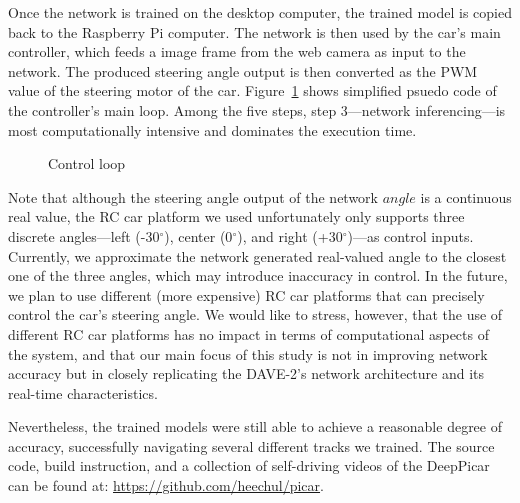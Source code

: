 Once the network is trained on the desktop computer, the trained model
is copied back to the Raspberry Pi computer. The network is then used
by the car's main controller, which feeds a image frame from the web
camera as input to the network. The produced steering angle output is
then converted as the PWM value of the steering motor of the
car. Figure~\ref{fig:controlloop} shows simplified psuedo code of the
controller's main loop. Among the five steps, step 3---network
inferencing---is most computationally intensive and dominates the
execution time.

\begin{figure}[t]
  
  \caption{Control loop}
  \label{fig:controlloop}
\end{figure}

Note that although the steering angle output of the network $angle$ is
a continuous real value, the RC car platform we used unfortunately
only supports three discrete angles---left (-30$^{\circ}$), center
(0$^{\circ}$), and right (+30$^{\circ}$)---as control
inputs. Currently, we approximate the network generated real-valued
angle to the closest one of the three angles, which may
introduce inaccuracy in control.
In the future, we plan to use different (more expensive) RC car
platforms that can precisely control the car's steering angle. We
would like to stress, however, that the use of different RC car
platforms has no impact in terms of computational 
aspects of the system, and that our main focus of this study is
not in improving network accuracy but in closely replicating the
DAVE-2's network architecture and its real-time characteristics.

Nevertheless, the trained models were still able to achieve a reasonable
degree of accuracy, successfully navigating several different tracks 
we trained. The source code, build instruction, and a collection of
self-driving videos of the DeepPicar can be found at:
\url{https://github.com/heechul/picar}.


